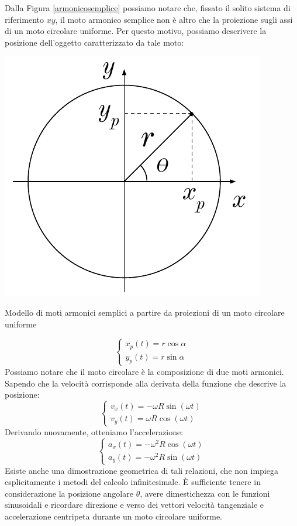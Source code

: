 Dalla Figura \ref{armonicosemplice} possiamo notare che, fissato il solito
sistema di riferimento $xy$, il moto armonico semplice non è altro che la
proiezione sugli assi di un moto circolare uniforme. Per questo motivo,
possiamo descrivere la posizione dell'oggetto caratterizzato da tale moto:
\begin{marginfigure}
    \centering
    \includegraphics[width = \marginparwidth]{figures/armonico.pdf}
    \caption{Modello di moti armonici semplici a partire da proiezioni
    di un moto circolare uniforme}
    \label{armonicosemplice}
\end{marginfigure}
\[
    \begin{cases}
        x_p(t) = r\cos\alpha\\
        y_p(t) = r\sin\alpha
    \end{cases}
\]
Possiamo notare che il moto circolare è la composizione di due moti
armonici.
Sapendo che la velocità corrisponde alla derivata della funzione che
descrive la posizione:
\[
    \begin{cases}
        v_x(t) = -\omega R \sin(\omega t)\\
        v_y(t) = \omega R \cos(\omega t)
    \end{cases}
\]
Derivando nuovamente, otteniamo l'accelerazione:
\[
    \begin{cases}
        a_x(t) = -\omega^2 R\cos(\omega t)\\
        a_y(t) = -\omega^2 R\sin(\omega t)
    \end{cases}
\]
Esiste anche una dimostrazione geometrica di tali relazioni, che non impiega
esplicitamente i metodi del calcolo infinitesimale. È sufficiente tenere in
considerazione la posizione angolare $\theta$, avere dimestichezza con le
funzioni sinusoidali e ricordare direzione e verso dei vettori velocità
tangenziale e accelerazione centripeta durante un moto circolare uniforme.

